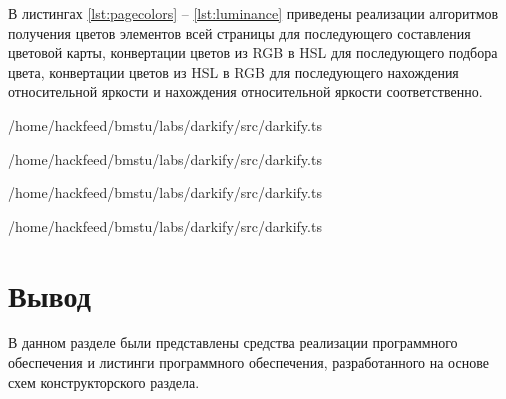 В листингах \ref{lst:pagecolors} -- \ref{lst:luminance} приведены реализации алгоритмов получения цветов элементов всей страницы для последующего составления цветовой карты, конвертации цветов из RGB в HSL для последующего подбора цвета, конвертации цветов из HSL в RGB для последующего нахождения относительной яркости и нахождения относительной яркости соответственно. 

\begin{lstinputlisting}[
	caption={Реализация алгоритма получения цветов всех элементов страницы},
	label={lst:pagecolors},
	style={ES6},
	linerange={141-160},
	]{/home/hackfeed/bmstu/labs/darkify/src/darkify.ts}
\end{lstinputlisting}

\begin{lstinputlisting}[
	caption={Реализация алгоритма конвертации цвета из RGB в HSL},
	label={lst:rgbtohsl},
	style={ES6},
	linerange={17-58},
	]{/home/hackfeed/bmstu/labs/darkify/src/darkify.ts}
\end{lstinputlisting}

\begin{lstinputlisting}[
	caption={Реализация алгоритма конвертации цвета из HSL в RGB},
	label={lst:hsltorgb},
	style={ES6},
	linerange={59-110},
	]{/home/hackfeed/bmstu/labs/darkify/src/darkify.ts}
\end{lstinputlisting}

\begin{lstinputlisting}[
	caption={Реализация алгоритма нахождения относительной яркости},
	label={lst:luminance},
	style={ES6},
	linerange={111-122},
	]{/home/hackfeed/bmstu/labs/darkify/src/darkify.ts}
\end{lstinputlisting}

\section*{Вывод}

В данном разделе были представлены средства реализации программного обеспечения и листинги программного обеспечения, разработанного на основе схем конструкторского раздела.
